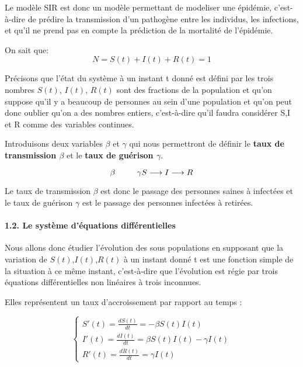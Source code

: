 \documentclass[
]{article}
\begin{document}
Le modèle SIR est donc un modèle permettant de modeliser une épidémie,
c'est-à-dire de prédire la transmission d'un pathogène entre les
individus, les infections, et qu'il ne prend pas en compte la prédiction
de la mortalité de l'épidémie.

On sait que: \[N = S(t) + I(t) + R(t) = 1\]

Précisons que l'état du système à un instant t donné est défini par les
trois nombres \(S(t)\), \(I(t)\), \(R(t)\) sont des fractions de la
population et qu'on suppose qu'il y a beaucoup de personnes au sein
d'une population et qu'on peut donc oublier qu'on a des nombres entiers,
c'est-à-dire qu'il faudra considérer S,I et R comme des variables
continues.

Introduisons deux variables \(\beta\) et \(\gamma\) qui nous permettront
de définir le \textbf{taux de transmission \(\beta\)} et le \textbf{taux
de guérison \(\gamma\)}.

\[\beta\ \ \ \ \ \ \ \ \gamma\\  S  \longrightarrow I \longrightarrow  R  \]

Le taux de transmission \(\beta\) est donc le passage des personnes
saines à infectées et le taux de guérison \(\gamma\) est le passage des
personnes infectées à retirées.

\hypertarget{le-systuxe8me-duxe9quations-diffuxe9rentielles}{%
\paragraph{1.2. Le système d'équations
différentielles}\label{le-systuxe8me-duxe9quations-diffuxe9rentielles}}

Nous allons donc étudier l'évolution des sous populations en supposant
que la variation de \(S(t)\),\(I(t)\),\(R(t)\) à un instant donné t est
une fonction simple de la situation à ce même instant, c'est-à-dire que
l'évolution est régie par trois équations différentielles non linéaires
à trois inconnues.

Elles représentent un taux d'accroissement par rapport au temps :

\[\begin{equation}
    \left\{
     \begin{array}{l}
        S'(t) = \frac{dS(t)}{dt} = - \beta S(t)  I(t)\\
        I'(t) = \frac{dI(t)}{dt} = \beta S(t)  I(t) - \gamma  I(t)\\
        R'(t) = \frac{dR(t)}{dt} = \gamma I(t)
      \end{array}
    \right.
\end{equation}\]
\end{document}
